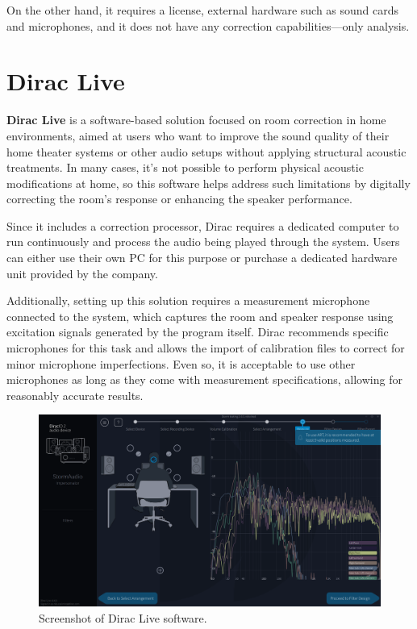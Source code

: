 On the other hand, it requires a license, external hardware such as sound cards and microphones, and it does not have any correction capabilities—only analysis.


\section{Dirac Live}

\textbf{Dirac Live} \cite{dirac_live} is a software-based solution focused on room correction in home environments, aimed at users who want to improve the sound quality of their home theater systems or other audio setups without applying structural acoustic treatments. In many cases, it's not possible to perform physical acoustic modifications at home, so this software helps address such limitations by digitally correcting the room’s response or enhancing the speaker performance.

Since it includes a correction processor, Dirac requires a dedicated computer to run continuously and process the audio being played through the system. Users can either use their own PC for this purpose or purchase a dedicated hardware unit provided by the company.

Additionally, setting up this solution requires a measurement microphone connected to the system, which captures the room and speaker response using excitation signals generated by the program itself. Dirac recommends specific microphones for this task and allows the import of calibration files to correct for minor microphone imperfections. Even so, it is acceptable to use other microphones as long as they come with measurement specifications, allowing for reasonably accurate results.

\begin{figure}[H]
	\centering
	\includegraphics[width=0.9
	\linewidth]{Figures/dirac.jpg}
	\caption{Screenshot of Dirac Live software.}
	\label{fig:Dirac}
\end{figure}

